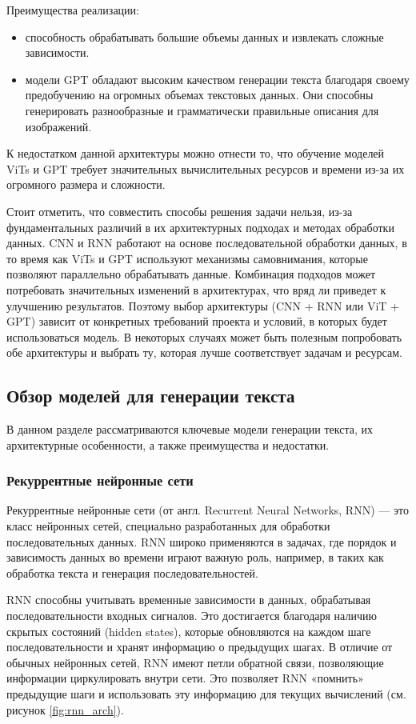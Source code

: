 \documentclass[a4paper,12pt]{extarticle}
\begin{document}
Преимущества реализации:
\begin{itemize}
	\item способность обрабатывать большие объемы данных и извлекать сложные зависимости.
	\item модели GPT обладают высоким качеством генерации текста благодаря своему предобучению на огромных объемах текстовых данных. Они способны генерировать разнообразные и грамматически правильные описания для изображений.
\end{itemize}

К недостатком данной архитектуры можно отнести то, что обучение моделей ViTs и GPT требует значительных вычислительных ресурсов и времени из-за их огромного размера и сложности.

Стоит отметить, что совместить способы решения задачи нельзя, из-за фундаментальных различий в их архитектурных подходах и методах обработки данных. CNN и RNN работают на основе последовательной обработки данных, в то время как ViTs и GPT используют механизмы самовнимания, которые позволяют параллельно обрабатывать данные. Комбинация подходов может потребовать значительных изменений в архитектурах, что вряд ли приведет к улучшению результатов. Поэтому выбор архитектуры (CNN + RNN или ViT + GPT) зависит от конкретных требований проекта и условий, в которых будет использоваться модель. В некоторых случаях может быть полезным попробовать обе архитектуры и выбрать ту, которая лучше соответствует задачам и ресурсам.

\subsection{Обзор моделей для генерации текста}

В данном разделе рассматриваются ключевые модели генерации текста, их архитектурные особенности, а также преимущества и недостатки.

\subsubsection{Рекуррентные нейронные сети}

Рекуррентные нейронные сети (от англ. Recurrent Neural Networks, RNN) — это класс нейронных сетей, специально разработанных для обработки последовательных данных. RNN широко применяются в задачах, где порядок и зависимость данных во времени играют важную роль, например, в таких как обработка текста и генерация последовательностей.

RNN способны учитывать временные зависимости в данных, обрабатывая последовательности входных сигналов. Это достигается благодаря наличию скрытых состояний (hidden states), которые обновляются на каждом шаге последовательности и хранят информацию о предыдущих шагах. В отличие от обычных нейронных сетей, RNN имеют петли обратной связи, позволяющие информации циркулировать внутри сети. Это позволяет RNN «помнить» предыдущие шаги и использовать эту информацию для текущих вычислений (см. рисунок \ref{fig:rnn_arch}).
\end{document}
